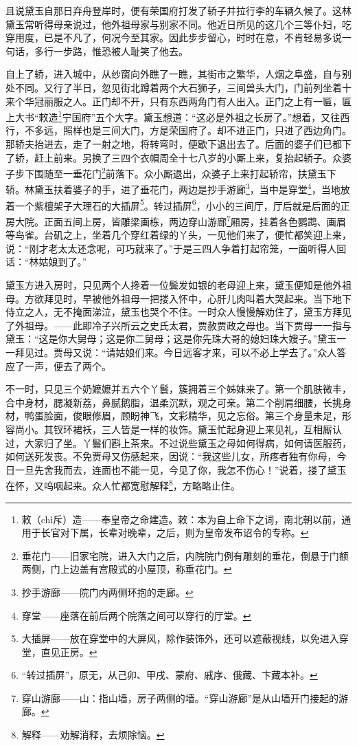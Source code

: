 \par 且说黛玉自那日弃舟登岸时，便有荣国府打发了轿子并拉行李的车辆久候了。这林黛玉常听得母亲说过，他外祖母家与别家不同。他近日所见的这几个三等仆妇，吃穿用度，已是不凡了，何况今至其家。因此步步留心，时时在意，不肯轻易多说一句话，多行一步路，惟恐被人耻笑了他去。
\par 自上了轿，进入城中，从纱窗向外瞧了一瞧，其街市之繁华，人烟之阜盛，自与别处不同。又行了半日，忽见街北蹲着两个大石狮子，三间兽头大门，门前列坐着十来个华冠丽服之人。正门却不开，只有东西两角门有人出入。正门之上有一匾，匾上大书“敕造\footnote{敕（chì斥）造——奉皇帝之命建造。敕：本为自上命下之词，南北朝以前，通用于长官对下属，长辈对晚辈，之后，则为皇帝发布诏令的专称。}宁国府”五个大字。黛玉想道：“这必是外祖之长房了。”想着，又往西行，不多远，照样也是三间大门，方是荣国府了。却不进正门，只进了西边角门。那轿夫抬进去，走了一射之地，将转弯时，便歇下退出去了。后面的婆子们已都下了轿，赶上前来。另换了三四个衣帽周全十七八岁的小厮上来，复抬起轿子。众婆子步下围随至一垂花门\footnote{垂花门——旧家宅院，进入大门之后，内院院门例有雕刻的垂花，倒悬于门额两侧，门上边盖有宫殿式的小屋顶，称垂花门。}前落下。众小厮退出，众婆子上来打起轿帘，扶黛玉下轿。林黛玉扶着婆子的手，进了垂花门，两边是抄手游廊\footnote{抄手游廊——院门内两侧环抱的走廊。}，当中是穿堂\footnote{穿堂——座落在前后两个院落之间可以穿行的厅堂。}，当地放着一个紫檀架子大理石的大插屏\footnote{大插屏——放在穿堂中的大屏风，除作装饰外，还可以遮蔽视线，以免进入穿堂，直见正房。}。转过插屏\footnote{“转过插屏”，原无，从己卯、甲戌、蒙府、戚序、俄藏、卞藏本补。}，小小的三间厅，厅后就是后面的正房大院。正面五间上房，皆雕梁画栋，两边穿山游廊\footnote{穿山游廊——山：指山墙，房子两侧的墙。“穿山游廊”是从山墙开门接起的游廊。}厢房，挂着各色鹦鹉、画眉等鸟雀。台矶之上，坐着几个穿红着绿的丫头，一见他们来了，便忙都笑迎上来，说：“刚才老太太还念呢，可巧就来了。”于是三四人争着打起帘笼，一面听得人回话：“林姑娘到了。”
\par 黛玉方进入房时，只见两个人搀着一位鬓发如银的老母迎上来，黛玉便知是他外祖母。方欲拜见时，早被他外祖母一把搂入怀中，心肝儿肉叫着大哭起来。当下地下侍立之人，无不掩面涕泣，黛玉也哭个不住。一时众人慢慢解劝住了，黛玉方拜见了外祖母。——此即冷子兴所云之史氏太君，贾赦贾政之母也。当下贾母一一指与黛玉：“这是你大舅母；这是你二舅母；这是你先珠大哥的媳妇珠大嫂子。”黛玉一一拜见过。贾母又说：“请姑娘们来。今日远客才来，可以不必上学去了。”众人答应了一声，便去了两个。
\par 不一时，只见三个奶嬷嬷并五六个丫鬟，簇拥着三个姊妹来了。第一个肌肤微丰，合中身材，腮凝新荔，鼻腻鹅脂，温柔沉默，观之可亲。第二个削肩细腰，长挑身材，鸭蛋脸面，俊眼修眉，顾盼神飞，文彩精华，见之忘俗。第三个身量未足，形容尚小。其钗环裙袄，三人皆是一样的妆饰。黛玉忙起身迎上来见礼，互相厮认过，大家归了坐。丫鬟们斟上茶来。不过说些黛玉之母如何得病，如何请医服药，如何送死发丧。不免贾母又伤感起来，因说：“我这些儿女，所疼者独有你母，今日一旦先舍我而去，连面也不能一见，今见了你，我怎不伤心！”说着，搂了黛玉在怀，又呜咽起来。众人忙都宽慰解释\footnote{解释——劝解消释，去烦除恼。}，方略略止住。
